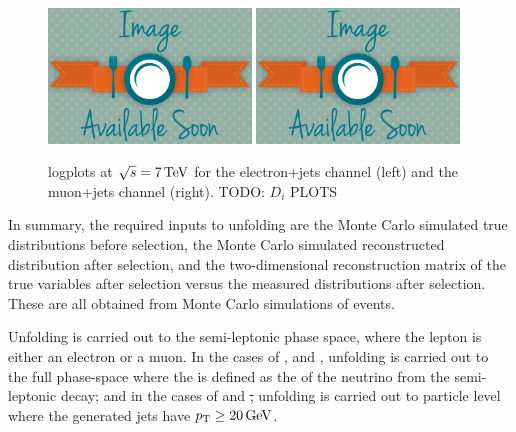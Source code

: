 \begin{figure}[hbtp]
    \centering
     \includegraphics[width=0.48\textwidth]{Chapters/04_Analysis/04b_XSections/images/placeholder.png}\hfill
     \includegraphics[width=0.48\textwidth]{Chapters/04_Analysis/04b_XSections/images/placeholder.png}\\
	 \caption{log\abs[d[i] plots at $\sqrt{s}=7\,\text{Te\hspace{-.08em}V}$ for the electron+jets channel (left) and the muon+jets
	 channel (right). TODO: $D_i$ PLOTS} %
     \label{fig:d_plots_7TeV}
\end{figure}



In summary, the required inputs to unfolding are the Monte Carlo simulated true distributions before
selection, the Monte Carlo simulated reconstructed distribution after selection, and the two-dimensional reconstruction
matrix of the true variables after selection versus the measured distributions after selection. These are all
obtained from Monte Carlo simulations of \ttbar events. 

Unfolding is carried out to the semi-leptonic phase space, where the lepton is either an electron or a muon.
In the cases of \met, \wpt and \mt, unfolding is carried out to the full phase-space where the \met is defined
as the \pt of the neutrino from the semi-leptonic decay; and in the cases of \HT and \st, unfolding is carried
out to particle level where the generated jets have $p_{\mathrm{T}}\geq20\,\text{Ge\hspace{-.08em}V}$.

